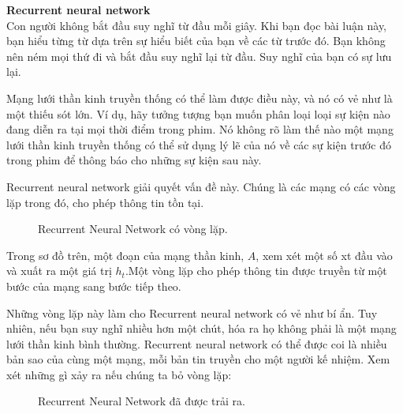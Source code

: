 \textbf{Recurrent neural network} \\[0.2em]
Con người không bắt đầu suy nghĩ từ đầu mỗi giây.
Khi bạn đọc bài luận này, bạn hiểu từng từ dựa trên sự hiểu biết của bạn về các từ trước đó.
Bạn không nên ném mọi thứ đi và bắt đầu suy nghĩ lại từ đầu. Suy nghĩ của bạn
có sự lưu lại.

Mạng lưới thần kinh truyền thống có thể làm được điều này, và nó có vẻ như là một
thiếu sót lớn.
Ví dụ, hãy tưởng tượng bạn muốn phân loại loại sự kiện nào đang diễn ra tại mọi thời điểm trong phim.
Nó không rõ làm thế nào một mạng lưới thần kinh truyền thống có thể sử dụng lý lẽ của nó về các sự kiện trước đó trong phim để thông báo cho những sự kiện sau này.

Recurrent neural network giải quyết vấn đề này. Chúng là các mạng có các vòng lặp trong đó, cho phép thông tin tồn tại.
\begin{figure}[!htb]
    \caption{\label{fig:rnn-rolled} Recurrent Neural Network có vòng lặp.}
\end{figure}

Trong sơ đồ trên, một đoạn của mạng thần kinh, \(A\), xem xét một số xt đầu vào và xuất ra một giá trị
\(h_t\).Một vòng lặp cho phép thông tin được truyền từ một bước của mạng sang bước tiếp theo.

Những vòng lặp này làm cho Recurrent neural network có vẻ như bí ẩn.
Tuy nhiên, nếu bạn suy nghĩ nhiều hơn một chút, hóa ra họ không phải là một mạng lưới thần kinh bình thường.
Recurrent neural network có thể được coi là nhiều bản sao của cùng một mạng, mỗi bản tin truyền cho một người kế nhiệm.
Xem xét những gì xảy ra nếu chúng ta bỏ vòng lặp:

\begin{figure}[!htb]
    \caption{\label{fig:rnn-unrolled} Recurrent Neural Network đã được trải ra.}
\end{figure}


